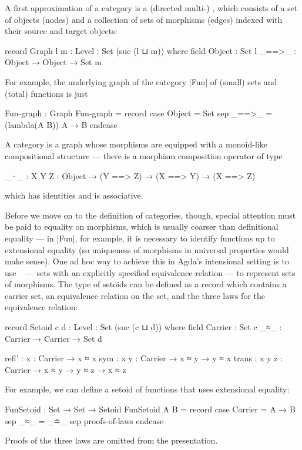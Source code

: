 A first approximation of a category is a (directed multi-) , which consists of a set of objects (nodes) and a collection of sets of morphisms (edges) indexed with their source and target objects:
\begin{code}
record Graph {l m : Level} : Set (suc (l ⊔ m)) where
  field
    Object    :  Set l
    _==>_     :  Object → Object → Set m
\end{code}
For example, the underlying graph of the category |Fun| of (small) sets and (total) functions is just
\begin{code}
Fun-graph : Graph
Fun-graph = record  case  Object  = Set
                    sep   _==>_   = (lambda(A B)) A → B endcase
\end{code}
A category is a graph whose morphisms are equipped with a monoid-like compositional structure --- there is a morphism composition operator of type
\begin{code}
_·_  : {X Y Z : Object} → (Y ==> Z) → (X ==> Y) → (X ==> Z)
\end{code}
which has identities and is associative.


Before we move on to the definition of categories, though, special attention must be paid to equality on morphisms, which is usually coarser than definitional equality --- in |Fun|, for example, it is necessary to identify functions up to extensional equality (so uniqueness of morphisms in universal properties would make sense).
One ad hoc way to achieve this in Agda's intensional setting is to use ~\citep{Barthe-setoids} --- sets with an explicitly specified equivalence relation --- to represent sets of morphisms.
The type of setoids can be defined as a record which contains a carrier set, an equivalence relation on the set, and the three laws for the equivalence relation:
\begin{code}
record Setoid {c d : Level} : Set (suc (c ⊔ d)) where
  field
    Carrier  : Set c
    _≈_      : Carrier → Carrier → Set d

    refl'  : {x : Carrier} → x ≈ x
    sym    : {x y : Carrier} → x ≈ y → y ≈ x
    trans  : {x y z : Carrier} → x ≈ y → y ≈ z → x ≈ z
\end{code}
For example, we can define a setoid of functions that uses extensional equality:
\begin{code}
FunSetoid : Set → Set → Setoid
FunSetoid A B = record  case  Carrier  =  A → B
                        sep   _≈_      =  _≐_
                        sep   proofs-of-laws endcase
\end{code}
Proofs of the three laws are omitted from the presentation.


